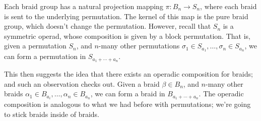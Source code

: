 Each braid group has a natural projection mapping $\pi: B_n \to S_n$, where 
each braid is sent to the underlying permutation. The kernel of this map is the 
pure braid group, which doesn't change the permutation. However, recall that $S_n$ 
is a symmetric operad, whose composition is given by a block permutation. 
That is, given a permutation $S_n$, and $n$-many other permutations $\sigma_1 \in S_{a_1}, \dots, 
\sigma_n \in S_{a_n}$, we can form a permutation in $S_{a_1 + \cdots + a_n}$.
\begin{center}
\end{center}  

This then suggests the idea that there exists an operadic composition for braids; and such 
an observation checks out. Given a braid $\beta \in B_n$, and $n$-many other 
braids $\alpha_1 \in B_{a_i}, \dots, \alpha_n \in B_{a_n}$, we can form a 
braid in $B_{a_1 + \cdots + a_n}$. The operadic composition is analogous to what 
we had before with permutations; we're going to stick braids inside of braids. 

